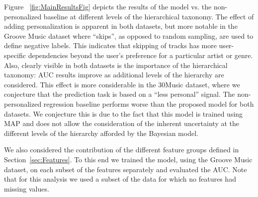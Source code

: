 
Figure ~\ref{fig:MainResultsFig} depicts the results of the model vs. the non-personalized baseline at different levels of the hierarchical taxonomy. The effect of adding personalization is apparent in both datasets, but more notable in the Groove Music dataset where ``skips'', as opposed to random sampling, are used to define negative labels. This indicates that skipping of tracks has more user-specific dependencies beyond the user's preference for a particular artist or genre.
Also, clearly visible in both datasets is the importance of the hierarchical taxonomy: AUC results improve as additional levels of the hierarchy are considered. This effect is more considerable in the 30Music dataset, where we conjecture that the prediction task is based on a ``less personal'' signal. The non-personalized regression baseline performs worse than the proposed model for both datasets. We conjecture this is due to the fact that this model is trained using MAP and does not allow the consideration of the inherent uncertainty at the different levels of the hierarchy afforded by the Bayesian model.


%

%


%




We also considered the contribution of the different feature groups defined in Section~\ref{sec:Features}. To this end we trained the model, using the Groove Music dataset, on each subset of the features separately and evaluated the AUC. Note that for this analysis we used a subset of the data for which no features had missing values. 

